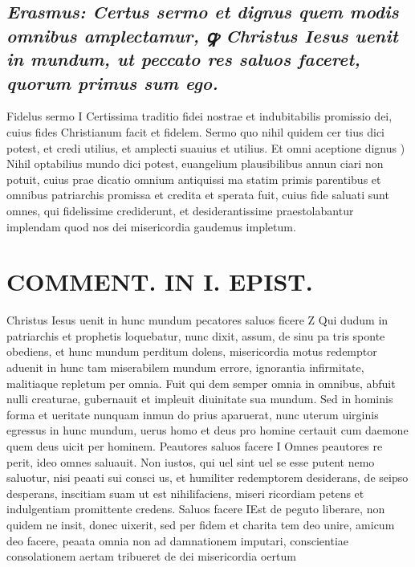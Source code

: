 \documentclass{article}
\begin{document}
\begin{pages}
\subsection*{\textit{Erasmus: Certus sermo et dignus quem modis omnibus amplectamur, ꝙ Christus Iesus uenit in mundum, ut peccato res saluos faceret, quorum primus sum ego. }}\pstart Fidelus sermo I Certissima traditio fidei nostrae et indubitabilis promissio dei, cuius fides Christianum facit et fidelem. Sermo quo nihil quidem cer tius dici potest, et credi utilius, et amplecti suauius et utilius.  \pend\pstart Et omni aceptione dignus ) Nihil optabilius mundo dici potest, euangelium plausibilibus annun ciari non potuit, cuius prae dicatio omnium antiquissi ma statim primis parentibus et omnibus patriarchis promissa et credita et sperata fuit, cuius fide saluati sunt omnes, qui fidelissime crediderunt, et desiderantissime praestolabantur implendam quod nos dei misericordia gaudemus impletum.  \pend
\section*{COMMENT. IN I. EPIST. }
\marginpar{[ p.32 ]}\pstart Christus Iesus uenit in hunc mundum pecatores saluos ficere Z Qui dudum in patriarchis et prophetis loquebatur, nunc dixit, assum, de sinu pa tris sponte obediens, et hunc mundum perditum dolens, misericordia motus redemptor aduenit in hunc tam miserabilem mundum errore, ignorantia infirmitate, malitiaque repletum per omnia. Fuit qui dem semper omnia in omnibus, abfuit nulli creaturae, gubernauit et impleuit diuinitate sua mundum. Sed in hominis forma et ueritate nunquam inmun do prius aparuerat, nunc uterum uirginis egressus in hunc mundum, uerus homo et deus pro homine certauit cum daemone quem deus uicit per hominem.  \pend\pstart Peautores saluos facere I Omnes peautores re perit, ideo omnes saluauit. Non iustos, qui uel sint uel se esse putent nemo saluotur, nisi peaati sui consci us, et humiliter redemptorem desiderans, de seipso desperans, inscitiam suam ut est nihilifaciens, miseri ricordiam petens et indulgentiam promittente credens.  \pend\pstart Saluos facere IEst de peguto liberare, non quidem ne insit, donec uixerit, sed per fidem et charita tem deo unire, amicum deo facere, peaata omnia non ad damnationem imputari, conscientiae consolationem aertam tribueret de dei misericordia oertum  \pend

\end{pages}
\end{document}
